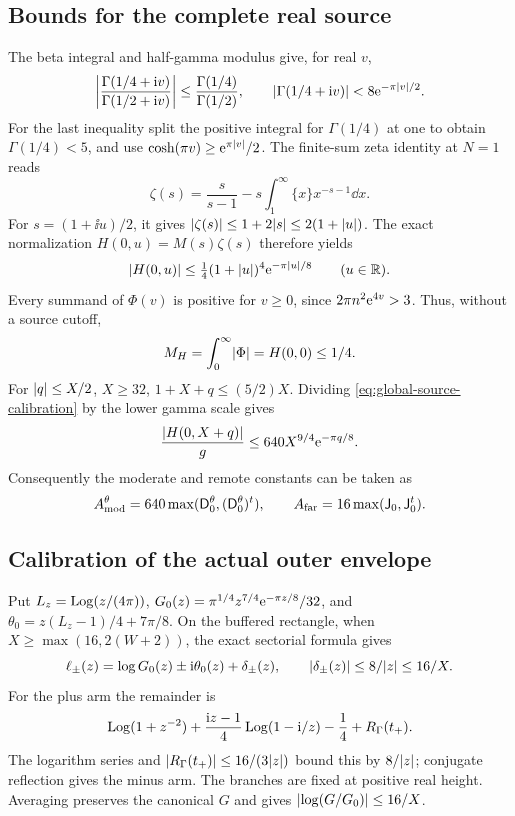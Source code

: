 \subsection{Bounds for the complete real source}
The beta integral and half-gamma modulus \cite{dlmfbeta,dlmfhalf}
give, for real \(v\),
\[
 \left|\frac{\Gamma(1/4+\mathrm i v)}{\Gamma(1/2+\mathrm i v)}\right|
 \le\frac{\Gamma(1/4)}{\Gamma(1/2)},\qquad
 \lvert \Gamma(1/4+\mathrm i v)\rvert<8\mathrm e^{-\pi\lvert v\rvert/2}.
\]
For the last inequality split the positive integral for \(\Gamma(1/4)\)
at one to obtain \(\Gamma(1/4)<5\), and use
\(\cosh(\pi v)\ge\mathrm e^{\pi\lvert v\rvert}/2\).
The finite-sum zeta identity \cite{dlmfzeta} at \(N=1\) reads
\[
 \zeta(s)=\frac{s}{s-1}-s\int_1^\infty\{x\}x^{-s-1}\dd x.
\]
For \(s=(1+\ii u)/2\), it gives
\(\lvert \zeta(s)\rvert\le1+2\lvert s\rvert\le2(1+\lvert u\rvert)\).
The exact normalization \(H(0,u)=M(s)\zeta(s)\) therefore yields
\begin{equation}
 \lvert H(0,u)\rvert\le\tfrac14(1+\lvert u\rvert)^4\mathrm e^{-\pi\lvert u\rvert/8}
 \qquad(u\in\mathbb R).
 \label{eq:global-source-calibration}
\end{equation}
Every summand of \(\Phi(v)\) is positive for \(v\ge0\), since
\(2\pi n^2\mathrm e^{4v}>3\). Thus, without a source cutoff,
\begin{equation}
 M_H=\int_0^\infty\lvert \Phi\rvert=H(0,0)\le1/4.
 \label{eq:complete-source-mass}
\end{equation}
For \(\lvert q\rvert\le X/2\), \(X\ge32\),
\(1+X+q\le(5/2)X\). Dividing
\eqref{eq:global-source-calibration} by the lower gamma scale gives
\[
 \frac{\lvert H(0,X+q)\rvert}g
     \le640X^{9/4}\mathrm e^{-\pi q/8}.
\]
Consequently the moderate and remote constants can be taken as
\begin{equation}
 A_{\rm mod}^{\theta}=640\max(\mathsf D_0^\theta,
                    (\mathsf D_0^\theta)^t),\qquad
 A_{\rm far}=16\max(\mathsf J_0,\mathsf J_0^t).
 \label{eq:explicit-tail-calibration}
\end{equation}

\subsection{Calibration of the actual outer envelope}
Put \(L_z=\operatorname{Log}(z/(4\pi))\),
\(G_0(z)=\pi^{1/4}z^{7/4}\mathrm e^{-\pi z/8}/32\), and
\(\theta_0=z(L_z-1)/4+7\pi/8\).
On the buffered rectangle, when \(X\ge\max(16,2(W+2))\),
the exact sectorial formula gives
\begin{equation}
 \ell_\pm(z)=\log G_0(z)\pm\mathrm i\theta_0(z)+\delta_\pm(z),
 \qquad\lvert \delta_\pm(z)\rvert\le8/\lvert z\rvert\le16/X.
 \label{eq:complex-gamma-calibration}
\end{equation}
For the plus arm the remainder is
\[
 \operatorname{Log}(1+z^{-2})+\frac{\mathrm i z-1}{4}\operatorname{Log}(1-\mathrm i/z)
                      -\frac14+R_\Gamma(t_+).
\]
The logarithm series and \(\lvert R_\Gamma(t_+)\rvert\le16/(3\lvert z\rvert)\)
bound this by \(8/\lvert z\rvert\); conjugate reflection gives the minus arm.
The branches are fixed at positive real height. Averaging preserves the
canonical \(G\) and gives \(\lvert \log(G/G_0)\rvert\le16/X\).

